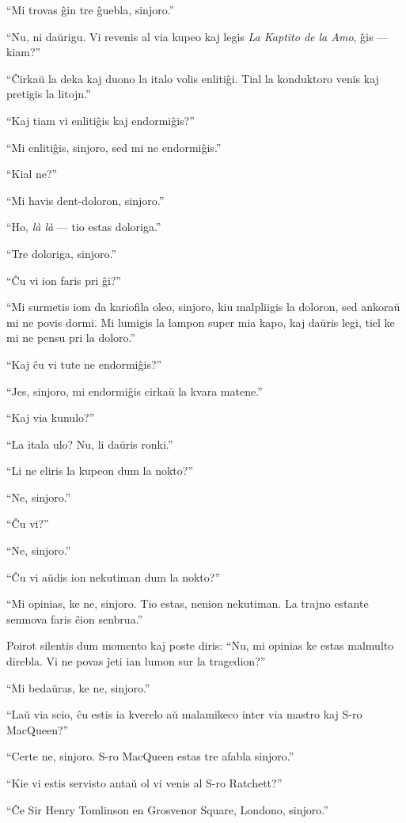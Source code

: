 ``Mi trovas ĝin tre ĝuebla, sinjoro.''

``Nu, ni daŭrigu. Vi revenis al via kupeo kaj legis \emph{La Kaptito de la Amo}, ĝis --- kiam?''

``Ĉirkaŭ la deka kaj duono la italo volis enlitiĝi. Tial la konduktoro venis kaj pretigis la litojn.''

``Kaj tiam vi enlitiĝis kaj endormiĝis?''

``Mi enlitiĝis, sinjoro, sed mi ne endormiĝis.''

``Kial ne?''

``Mi havis dent-doloron, sinjoro.''

``Ho, \emph{là là} --- tio estas doloriga.''

``Tre doloriga, sinjoro.''

``Ĉu vi ion faris pri ĝi?''

``Mi surmetis iom da kariofila oleo, sinjoro, kiu malpliigis la doloron, sed ankoraŭ mi ne povis dormi. Mi lumigis la lampon super mia kapo, kaj daŭris legi, tiel ke mi ne pensu pri la doloro.''

``Kaj ĉu vi tute ne endormiĝis?''

``Jes, sinjoro, mi endormiĝis cirkaŭ la kvara matene.''

``Kaj via kunulo?''

``La itala ulo? Nu, li daŭris ronki.''

``Li ne eliris la kupeon dum la nokto?''

``Ne, sinjoro.''

``Ĉu vi?''

``Ne, sinjoro.''

``Ĉu vi aŭdis ion nekutiman dum la nokto?''

``Mi opinias, ke ne, sinjoro. Tio estas, nenion nekutiman. La trajno estante senmova faris ĉion senbrua.''

Poirot silentis dum momento kaj poste diris: ``Nu, mi opinias ke estas malmulto direbla. Vi ne povas ĵeti ian lumon sur la tragedion?''

``Mi bedaŭras, ke ne, sinjoro.''

``Laŭ via scio, ĉu estis ia kverelo aŭ malamikeco inter via mastro kaj S-ro MacQueen?''

``Certe ne, sinjoro. S-ro MacQueen estas tre afabla sinjoro.''

``Kie vi estis servisto antaŭ ol vi venis al S-ro Ratchett?''

``Ĉe Sir Henry Tomlinson en Grosvenor Square, Londono, sinjoro.''

